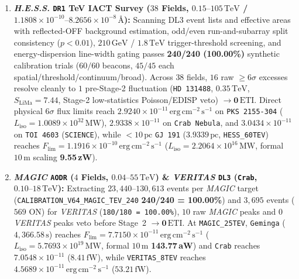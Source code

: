 \documentclass[twocolumn,10pt]{article}
\begin{document}
\begin{enumerate}
  \item \textbf{\textit{H.E.S.S.} \texttt{DR1} TeV IACT Survey ($38$ Fields, $0.15\text{--}105\,\mathrm{TeV}$ / $1.1808\times 10^{-10}\text{--}8.2656\times 10^{-8}\,\text{\AA}$):} Scanning DL3 event lists and effective areas \cite{Aharonian2006} with reflected-OFF background estimation, odd/even run-and-subarray split consistency ($p<0.01$), $210\,\mathrm{GeV}$ / $1.8\,\mathrm{TeV}$ trigger-threshold screening, and energy-dispersion line-width gating passes \textbf{240/240 (100.00\%)} synthetic calibration trials ($60/60$ beacons, $45/45$ each spatial/threshold/continuum/broad). Across $38$ fields, $16$ raw $\ge 6\sigma$ excesses resolve cleanly to $1$ pre-Stage-2 fluctuation (\texttt{HD\,131488}, $0.35\,\mathrm{TeV}$, $S_{\mathrm{LiMa}}=7.44$, Stage-2 low-statistics Poisson/EDISP veto) $\rightarrow \mathbf{0\,\mathrm{ETI}}$. Direct physical $6\sigma$ flux limits reach \textbf{$2.9240\times 10^{-11}\,\mathrm{erg\,cm^{-2}\,s^{-1}}$} on \texttt{PKS\,2155-304} ($L_{\mathrm{iso}} = 1.0089\times 10^{32}\,\mathrm{MW}$), \textbf{$2.9338\times 10^{-11}$} on \texttt{Crab Nebula}, and \textbf{$3.0434\times 10^{-11}$} on \texttt{TOI\,4603} (\texttt{SCIENCE}), while $<10\,\text{pc}$ \texttt{GJ\,191} ($3.9339\,\text{pc}$, \texttt{HESS\_60TEV}) reaches $F_{\mathrm{lim}} = 1.1916\times 10^{-10}\,\mathrm{erg\,cm^{-2}\,s^{-1}}$ ($L_{\mathrm{iso}} = 2.2064\times 10^{16}\,\mathrm{MW}$, formal $10\,\text{m}$ scaling \textbf{9.55\,zW}).
  \item \textbf{\textit{MAGIC} \texttt{AODR} ($4$ Fields, $0.04\text{--}55\,\mathrm{TeV}$) \& \textit{VERITAS} \texttt{DL3} (\texttt{Crab}, $0.10\text{--}18\,\mathrm{TeV}$):} Extracting $23{,}440\text{--}130{,}613$ events per \textit{MAGIC} target \cite{Aleksic2016} (\texttt{CALIBRATION\_V64\_MAGIC\_TEV\_240} \textbf{240/240 = 100.00\%}) and $3{,}695$ events ($569$ ON) for \textit{VERITAS} \cite{Holder2006} (\texttt{180/180 = 100.00\%}), $10$ raw \textit{MAGIC} peaks and $0$ \textit{VERITAS} peaks veto before Stage~2 $\rightarrow \mathbf{0\,\mathrm{ETI}}$. At \texttt{MAGIC\_25TEV}, \texttt{Geminga} ($4{,}366.58\,\text{s}$) reaches $F_{\mathrm{lim}} = 7.7150\times 10^{-11}\,\mathrm{erg\,cm^{-2}\,s^{-1}}$ ($L_{\mathrm{iso}} = 5.7693\times 10^{19}\,\mathrm{MW}$, formal $10\,\text{m}$ \textbf{143.77\,aW}) and \texttt{Crab} reaches $7.0548\times 10^{-11}$ ($8.41\,\text{fW}$), while \texttt{VERITAS\_8TEV} reaches \textbf{$4.5689\times 10^{-11}\,\mathrm{erg\,cm^{-2}\,s^{-1}}$} ($53.21\,\text{fW}$).

\end{enumerate}
\end{document}
